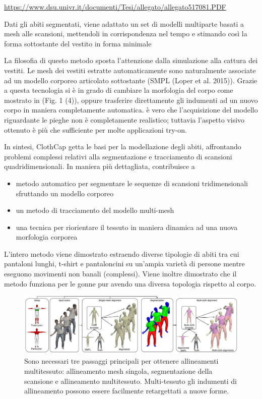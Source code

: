 \url{https://www.dsu.univr.it/documenti/Tesi/allegato/allegato517081.PDF}

\medskip

Dati gli abiti segmentati, viene adattato un set di modelli multiparte basati a mesh alle scansioni, mettendoli in corrispondenza nel tempo e stimando così la forma sottostante del vestito in forma minimale

\medskip

La filosofia di questo metodo sposta l’attenzione dalla simulazione alla cattura dei vestiti.
Le mesh dei vestiti estratte automaticamente sono naturalmente associate ad un modello corporeo articolato sottostante (SMPL (Loper et al. 2015)).
Grazie a questa tecnologia si è in grado di cambiare la morfologia del corpo come mostrato in (Fig. 1 (4)), oppure trasferire direttamente gli indumenti ad un nuovo corpo in maniera completamente automatica.
è vero che l’acquisizione del modello riguardante le pieghe non è completamente realistico; tuttavia l’aspetto visivo ottenuto è più che sufficiente per molte applicazioni try-on.


\medskip

In sintesi, ClothCap getta le basi per la modellazione degli abiti, affrontando problemi complessi relativi alla segmentazione e tracciamento di scansioni quadridimensionali.
In maniera più dettagliata, contribuisce a 
\begin{itemize}
\item metodo automatico per segmentare le sequenze di scansioni tridimensionali sfruttando un modello corporeo
\item un metodo di tracciamento del modello multi-mesh
\item una tecnica per riorientare il tessuto in maniera dinamica ad una nuova morfologia corporea
\end{itemize}


\medskip

L’intero metodo viene dimostrato estraendo diverse tipologie di abiti tra cui pantaloni lunghi, t-shirt e pantaloncini su un’ampia varietà di persone mentre eseguono movimenti non banali (complessi). Viene inoltre dimostrato che il metodo funziona per le gonne pur avendo una diversa topologia rispetto al corpo.

\medskip

\begin{figure}[ht!]
  \centering
  \includegraphics[scale=0.5]{Images/SizerPic/Sizer7.png}
  \caption{Sono necessari tre passaggi principali per ottenere allineamenti multitessuto: allineamento mesh singola, segmentazione della scansione e allineamento multitessuto. Multi-tessuto
gli indumenti di allineamento possono essere facilmente retargettati a nuove forme.}
    \label{fig:Sizer7}
\end{figure}

